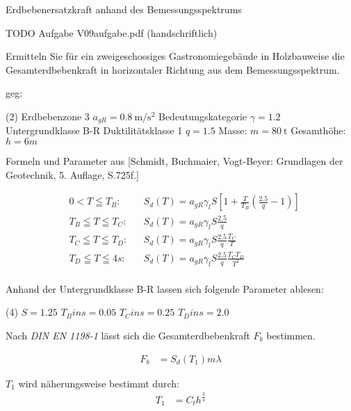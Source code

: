 Erdbebenersatzkraft anhand des Bemessungsspektrums

\smallskip

TODO Aufgabe V09aufgabe.pdf (handschriftlich)



Ermitteln Sie für ein zweigeschossiges Gastronomiegebäude in Holzbauweise die Gesamterdbebenkraft in horizontaler Richtung
aus dem Bemessungsspektrum.

\begin{minipage}[t]{\linewidth}
    geg:
    \begin{tasks} (2)
        \task[] Erdbebenzone 3
        \task[] $a_{gR} = \SI{0.8}{\metre\per\second^2}$
        \task[] Bedeutungskategorie 
        \task[] $\gamma = 1.2$
        \task[] Untergrundklasse B-R
        \task[]
        \task[] Duktilitätsklasse 1
        \task[] $q = 1.5$
        \task[] Masse: $m =\SI{80}{\tonne}$
        \task[] Gesamthöhe: $h = 6m$
    \end{tasks}
\end{minipage}

Formeln und Parameter aus [Schmidt, Buchmaier, Vogt-Beyer: Grundlagen der Geotechnik, 5. Auflage, S.725f.]

\begin{align*}
    &0 < T \leqq T_B: &&S_d(T) = a_{gR} \gamma_l S [1 + \frac{T}{T_B}(\frac{2.5}{q} -1)] \\
    &T_B \leqq T \leqq T_C: &&S_d(T) = a_{gR} \gamma_l S \frac{2.5}{q} \\
    &T_C \leqq T \leqq T_D: &&S_d(T) = a_{gR} \gamma_l S \frac{2.5}{q} \frac{T_C}{T} \\
    &T_D \leqq T \leqq 4s: &&S_d(T) = a_{gR} \gamma_l S \frac{2.5}{q} \frac{T_C T_D}{T^2} \\
\end{align*}

Anhand der Untergrundklasse B-R lassen sich folgende Parameter ablesen:
\begin{tasks} (4)
    \task[] $S = 1.25$
    \task[] $T_B in s = 0.05$
    \task[] $T_C in s = 0.25$
    \task[] $T_D in s = 2.0$
\end{tasks}

Nach \textit{DIN EN 1198-1} lässt sich die Gesamterdbebenkraft $F_b$ bestimmen.

\begin{align}
    F_b &= S_d(T_1) m \lambda
\end{align}

$T_1$ wird näherungsweise bestimmt durch:
\begin{align}
    T_1 &= C_t h^{\frac{3}{4}}
\end{align}

\begin{solution}
    
\end{solution}
